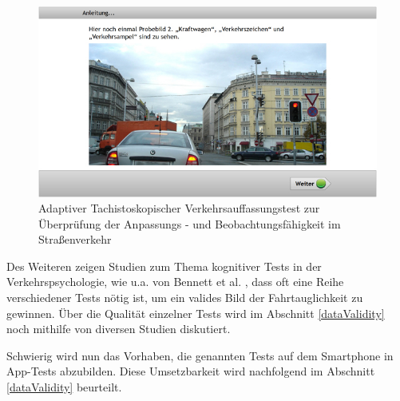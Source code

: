 \begin{figure}[H]
\centering
\includegraphics[width=0.95\linewidth]{images/atavt}
\caption[Caption for parameters]{Adaptiver Tachistoskopischer Verkehrsauffassungstest zur Überprüfung der Anpassungs - und Beobachtungsfähigkeit im Straßenverkehr \footnotemark}
\label{fig:atavt}
\end{figure}

Des Weiteren zeigen Studien zum Thema kognitiver Tests in der Verkehrspsychologie, wie u.a. von Bennett et al. \cite{cognitivetestsfitnesstodrive}, dass oft eine Reihe verschiedener Tests nötig ist, um ein valides Bild der Fahrtauglichkeit zu gewinnen. Über die Qualität einzelner Tests wird im Abschnitt \ref{dataValidity} noch mithilfe von diversen Studien diskutiert.

Schwierig wird nun das Vorhaben, die genannten Tests auf dem Smartphone in App-Tests abzubilden. Diese Umsetzbarkeit wird nachfolgend im Abschnitt \ref{dataValidity} beurteilt.

